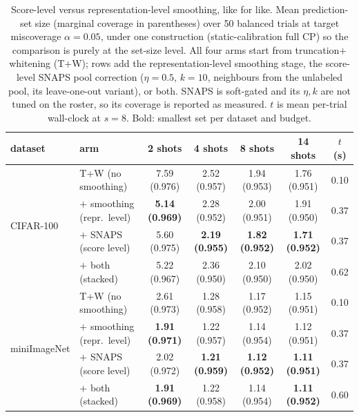 \begin{table}[t]
\centering
\small
\setlength{\tabcolsep}{4pt}
\caption{Score-level versus representation-level smoothing, like for like. Mean prediction-set size (marginal coverage in parentheses) over 50 balanced trials at target miscoverage $\alpha=0.05$, under one construction (static-calibration full CP) so the comparison is purely at the set-size level. All four arms start from truncation$+$whitening (T$+$W); rows add the representation-level smoothing stage, the score-level SNAPS pool correction ($\eta=0.5$, $k=10$, neighbours from the unlabeled pool, its leave-one-out variant), or both. SNAPS is soft-gated and its $\eta,k$ are not tuned on the roster, so its coverage is reported as measured. $t$ is mean per-trial wall-clock at $s=8$. Bold: smallest set per dataset and budget.}
\label{tab:snaps-vs-smoothing-a005}
\begin{tabular}{llccccc}
\toprule
dataset & arm & 2 shots & 4 shots & 8 shots & 14 shots & $t$ (s)\\
\midrule
\multirow{4}{*}{CIFAR-100} & T+W (no smoothing) & 7.59 {\scriptsize(0.976)} & 2.52 {\scriptsize(0.957)} & 1.94 {\scriptsize(0.953)} & 1.76 {\scriptsize(0.951)} & 0.10\\
 & $+$ smoothing (repr.\ level) & \textbf{5.14 {\scriptsize(0.969)}} & 2.28 {\scriptsize(0.952)} & 2.00 {\scriptsize(0.951)} & 1.91 {\scriptsize(0.950)} & 0.37\\
 & $+$ SNAPS (score level) & 5.60 {\scriptsize(0.975)} & \textbf{2.19 {\scriptsize(0.955)}} & \textbf{1.82 {\scriptsize(0.952)}} & \textbf{1.71 {\scriptsize(0.952)}} & 0.37\\
 & $+$ both (stacked) & 5.22 {\scriptsize(0.967)} & 2.36 {\scriptsize(0.950)} & 2.10 {\scriptsize(0.950)} & 2.02 {\scriptsize(0.950)} & 0.62\\
\midrule
\multirow{4}{*}{miniImageNet} & T+W (no smoothing) & 2.61 {\scriptsize(0.973)} & 1.28 {\scriptsize(0.958)} & 1.17 {\scriptsize(0.952)} & 1.15 {\scriptsize(0.951)} & 0.10\\
 & $+$ smoothing (repr.\ level) & \textbf{1.91 {\scriptsize(0.971)}} & 1.22 {\scriptsize(0.957)} & 1.14 {\scriptsize(0.954)} & 1.12 {\scriptsize(0.951)} & 0.37\\
 & $+$ SNAPS (score level) & 2.02 {\scriptsize(0.972)} & \textbf{1.21 {\scriptsize(0.959)}} & \textbf{1.12 {\scriptsize(0.952)}} & \textbf{1.11 {\scriptsize(0.951)}} & 0.37\\
 & $+$ both (stacked) & \textbf{1.91 {\scriptsize(0.969)}} & 1.22 {\scriptsize(0.958)} & 1.14 {\scriptsize(0.954)} & \textbf{1.11 {\scriptsize(0.952)}} & 0.60\\
\bottomrule
\end{tabular}
\end{table}
